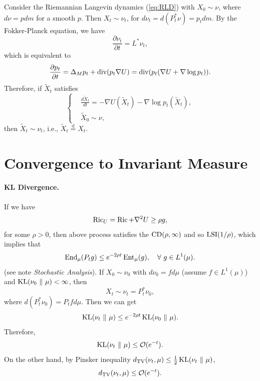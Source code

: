 Consider the Riemannian Langevin dynamics (\ref{eq:RLD}) with $X_0 \sim \nu$, where $d\nu = p dm$ for a smooth $p$. Then $X_t \sim \nu_t$, for $d\nu_t = d(P_t^*\nu) = p_t dm$. By the Fokker-Planck equation, we have
\begin{equation*}
    \frac{\partial \nu_t}{\partial t} = L^*\nu_t,
\end{equation*}
which is equivalent to
\begin{equation*}
    \frac{\partial p_t}{\partial t} = \Delta_Mp_t + \operatorname{div}(p_t\nabla U) = \operatorname{div}(p_t(\nabla U + \nabla \log p_t)).
\end{equation*}
Therefore, if $\widetilde{X}_t$ satisfies
\begin{equation*}
    \left\{
        \begin{aligned}
            &\frac{d \widetilde{X}_t}{dt} = -\nabla U(\widetilde{X}_t) -\nabla \log p_t(\widetilde{X}_t), \\
            &\widetilde{X}_0 \sim \nu,
        \end{aligned}
    \right.
\end{equation*}
then $\widetilde{X}_t \sim \nu_t$, i.e., $\widetilde{X}_t \stackrel{\mathrm{d}}{=} X_t$.

\section{Convergence to Invariant Measure}

\paragraph{KL Divergence.} If we have
\begin{equation*}
    \operatorname{Ric}_U = \operatorname{Ric} + \nabla^2 U \geq \rho g,
\end{equation*}
for some $\rho > 0$, then above process satisfies the $\operatorname{CD}(\rho,\infty)$ and so $\operatorname{LSI}(1/\rho)$, which implies that
\begin{equation*}
    \operatorname{End}_\mu(P_tg) \leq e^{-2\rho t}\operatorname{Ent}_\mu(g),\quad \forall~g\in L^1(\mu).
\end{equation*}
(see note \emph{Stochastic Analysis}). If $X_0 \sim \nu_0$ with $d\nu_0 = f d\mu$ (assume $f \in L^1(\mu)$) and $\operatorname{KL}(\nu_0 ~\Vert~ \mu) < \infty$, then
\begin{equation*}
    X_t \sim \nu_t = P_t^*\nu_0,
\end{equation*}
where $d(P_t^*\nu_0) = P_tf d\mu$. Then we can get
\begin{equation*}
    \operatorname{KL}(\nu_t ~\Vert~ \mu) \leq e^{-2\rho t} \operatorname{KL}(\nu_0 ~\Vert~ \mu).
\end{equation*}
Therefore,
\begin{equation*}
    \operatorname{KL}(\nu_t ~\Vert~ \mu) \leq \mathcal{O}(e^{-t}).
\end{equation*}
On the other hand, by Pinsker inequality $d_{\operatorname{TV}}(\nu_t,\mu) \leq \frac{1}{2}\operatorname{KL}(\nu_t ~\Vert~ \mu)$,
\begin{equation*}
    d_{\operatorname{TV}}(\nu_t,\mu) \leq \mathcal{O}(e^{-t}).
\end{equation*}

